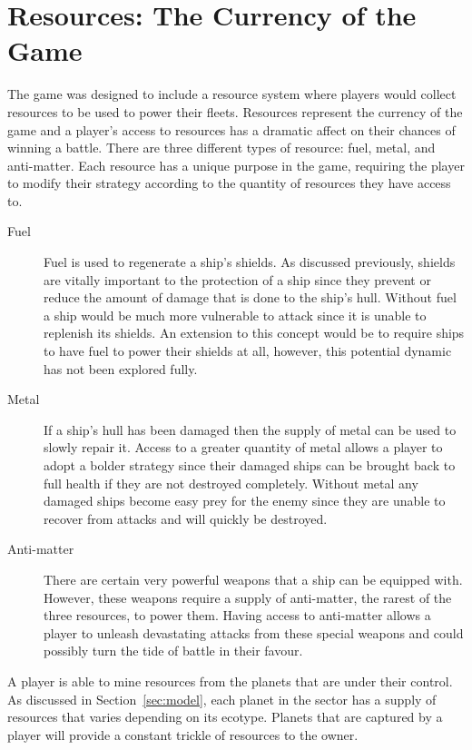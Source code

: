 \section{Resources: The Currency of the Game}
\label{sec:resources}

The game was designed to include a resource system where players would collect resources to be used to power their fleets. Resources represent the currency of the game and a player's access to resources has a dramatic affect on their chances of winning a battle. There are three different types of resource: fuel, metal, and anti-matter. Each resource has a unique purpose in the game, requiring the player to modify their strategy according to the quantity of resources they have access to.

\begin{description}
\item[Fuel] Fuel is used to regenerate a ship's shields. As discussed previously, shields are vitally important to the protection of a ship since they prevent or reduce the amount of damage that is done to the ship's hull. Without fuel a ship would be much more vulnerable to attack since it is unable to replenish its shields. An extension to this concept would be to require ships to have fuel to power their shields at all, however, this potential dynamic has not been explored fully.

\item[Metal] If a ship's hull has been damaged then the supply of metal can be used to slowly repair it. Access to a greater quantity of metal allows a player to adopt a bolder strategy since their damaged ships can be brought back to full health if they are not destroyed completely. Without metal any damaged ships become easy prey for the enemy since they are unable to recover from attacks and will quickly be destroyed.

\item[Anti-matter] There are certain very powerful weapons that a ship can be equipped with. However, these weapons require a supply of anti-matter, the rarest of the three resources, to power them. Having access to anti-matter allows a player to unleash devastating attacks from these special weapons and could possibly turn the tide of battle in their favour.
\end{description}
\noindent
A player is able to mine resources from the planets that are under their control. As discussed in Section~\ref{sec:model}, each planet in the sector has a supply of resources that varies depending on its ecotype. Planets that are captured by a player will provide a constant trickle of resources to the owner.

